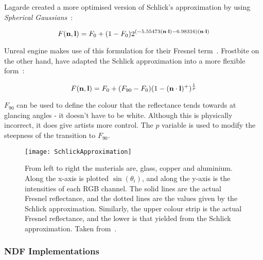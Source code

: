 Lagarde created a more optimised version of Schlick's approximation by using \textit{Spherical Gaussians}~\cite{LagardeSphericalGaussian}:

\vspace{-0.3cm}

\begin{equation} \label{eq:SphericalGaussian}
	F(\mathbf{n}, \mathbf{l}) = F_0 + (1 - F_0)2^{(-5.55473(\mathbf{n}\cdot\mathbf{l}) - 6.98316)(\mathbf{n}\cdot\mathbf{l})}
\end{equation}

Unreal engine makes use of this formulation for their Fresnel term~\cite{RealShadingInUnreal}. Frostbite on the other hand, have adapted the Schlick approximation into a more flexible form~\cite{MovingFrostbitetoPBR}:

\begin{equation} \label{eq:FlexibleSchlickApproximation}
	F(\mathbf{n}, \mathbf{l}) = F_0 + (F_{90} - F_0)(1 - (\mathbf{n}\cdot\mathbf{l})^+)^\frac{1}{p}
\end{equation}

\begin{math}F_{90}\end{math} can be used to define the colour that the reflectance tends towards at glancing angles - it doesn't have to be white. Although this is physically incorrect, it does give artists more control. The \begin{math}p\end{math} variable is used to modify the steepness of the transition to \begin{math}F_{90}\end{math}.

\begin{figure}[h]
	\centering
	\texttt{[image: SchlickApproximation]}
	\caption{From left to right the materials are, glass, copper and aluminium. Along the x-axis is plotted \begin{math}\sin(\theta_i)\end{math}, and along the y-axis is the intensities of each RGB channel. The solid lines are the actual Fresnel reflectance, and the dotted lines are the values given by the Schlick approximation. Similarly, the upper colour strip is the actual Fresnel reflectance, and the lower is that yielded from the Schlick approximation. Taken from~\cite{RTR4}.}
	\label{fig:SchlickApproximation}
\end{figure}

\subsubsection{NDF Implementations}

